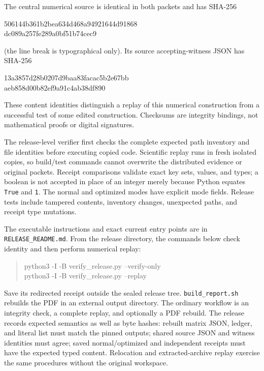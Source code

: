 \documentclass[11pt,letterpaper]{article}
\theoremstyle{definition}
\theoremstyle{remark}
\newcommand{\code}[1]{\nolinkurl{#1}}
\begin{document}
The central numerical source is identical in both packets and has SHA-256
\begin{center}\small\ttfamily
506144b361b2bea634d468a94921644d91868\\
 dc089a257fe289a0bf51b74cec9
\end{center}
(the line break is typographical only). Its source accepting-witness JSON has SHA-256
\begin{center}\small\ttfamily
13a3857d28b0207d9baa83facac5b2e67bb\\
 aeb858d00b82ef9a91c4ab38df890
\end{center}
These content identities distinguish a replay of this numerical construction from a successful test of some edited construction. Checksums are integrity bindings, not mathematical proofs or digital signatures.

The release-level verifier first checks the complete expected path inventory and file identities before executing copied code. Scientific replay runs in fresh isolated copies, so build/test commands cannot overwrite the distributed evidence or original packets. Receipt comparisons validate exact key sets, values, and types; a boolean is not accepted in place of an integer merely because Python equates \code{True} and \code{1}. The normal and optimized modes have explicit mode fields. Release tests include tampered contents, inventory changes, unexpected paths, and receipt type mutations.

The executable instructions and exact current entry points are in \code{RELEASE_README.md}. From the release directory, the commands below check identity and then perform numerical replay:
\begin{quote}\small\ttfamily
python3 -I -B verify\_release.py --verify-only\\
python3 -I -B verify\_release.py --replay
\end{quote}
 Save its redirected receipt outside the sealed release tree. \code{build_report.sh} rebuilds the PDF in an external output directory. The ordinary workflow is an integrity check, a complete replay, and optionally a PDF rebuild. The release records expected semantics as well as byte hashes: rebuilt matrix JSON, ledger, and literal list must match the pinned outputs; shared source JSON and witness identities must agree; saved normal/optimized and independent receipts must have the expected typed content. Relocation and extracted-archive replay exercise the same procedures without the original workspace.
\end{document}
